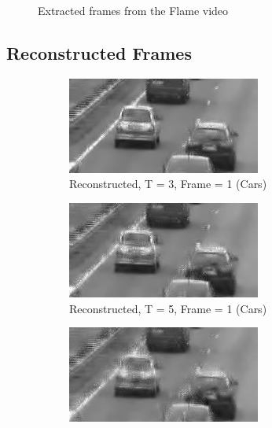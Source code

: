 \documentclass{article}
\begin{document}
\begin{enumerate}
\begin{figure}[h!]
    \caption{Extracted frames from the Flame video}
    \label{fig:flame_frames}
\end{figure}
\subsection{Reconstructed Frames}

\begin{figure}[h!]
    \centering
    \begin{subfigure}{0.3\textwidth}
        \centering
        \includegraphics[width=\linewidth]{../images/cars/reconstructed, T = 3, frame = 1.png}
        \caption{Reconstructed, T = 3, Frame = 1 (Cars)}
    \end{subfigure}
    \begin{subfigure}{0.3\textwidth}
        \centering
        \includegraphics[width=\linewidth]{../images/cars/reconstructed, T = 5, frame = 1.png}
        \caption{Reconstructed, T = 5, Frame = 1 (Cars)}
    \end{subfigure}
    \begin{subfigure}{0.3\textwidth}
        \centering
        \includegraphics[width=\linewidth]{../images/cars/reconstructed, T = 7, frame = 1.png}

\end{subfigure}
\end{figure}
\end{enumerate}
\end{document}
